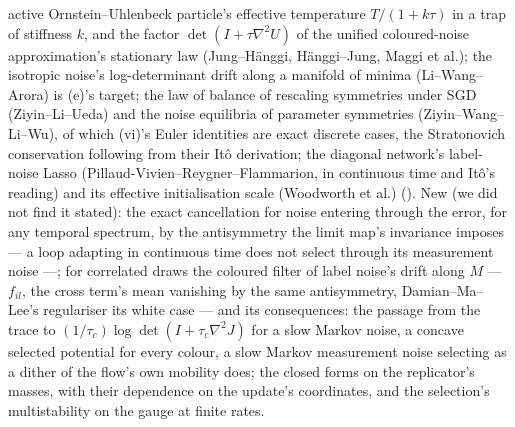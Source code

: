 {active Ornstein--Uhlenbeck particle's effective temperature $T/(1 + k\tau)$ in a trap of stiffness $k$, and the factor
$\det(I + \tau\nabla^2U)$ of the unified coloured-noise approximation's stationary law (Jung--H\"anggi, H\"anggi--Jung,
Maggi et al.); the isotropic noise's log-determinant drift along a manifold of minima (Li--Wang--Arora) is (e)'s target;
the law of balance of rescaling symmetries under SGD (Ziyin--Li--Ueda) and the noise equilibria of parameter symmetries
(Ziyin--Wang--Li--Wu), of which (vi)'s Euler identities are exact discrete cases, the Stratonovich conservation following
from their It\^o derivation; the diagonal network's label-noise Lasso (Pillaud-Vivien--Reygner--Flammarion, in
continuous time and It\^o's reading) and its effective initialisation scale (Woodworth et al.) (\cite{S69}). New (we did
not find it stated): the exact cancellation for noise entering through the error, for any temporal spectrum, by the
antisymmetry the limit map's invariance imposes --- a loop adapting in continuous time does not select through its
measurement noise ---; for correlated draws the coloured filter of label noise's drift along $M$ --- $f_{il}$, the cross
term's mean vanishing by the same antisymmetry, Damian--Ma--Lee's regulariser its white case --- and its consequences:
the passage from the trace to $(1/\tau_c)\log\det(I + \tau_c\nabla^2J)$ for a slow Markov noise, a concave selected
potential for every colour, a slow Markov measurement noise selecting as a dither of the flow's own mobility does; the
closed forms on the replicator's masses, with their dependence on the update's coordinates, and the selection's
multistability on the gauge at finite rates.}

